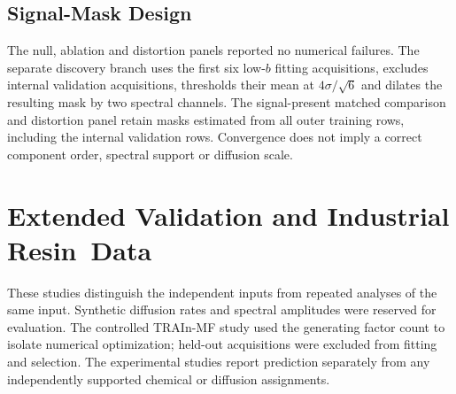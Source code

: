 \documentclass[mathematics,article,accept,moreauthors]{Definitions/mdpi}
\begin{document}
\subsection{Signal-Mask Design}
The null, ablation and distortion panels reported no numerical failures. The separate discovery branch uses the first six low-$b$ fitting acquisitions, excludes internal validation acquisitions, thresholds their mean at $4\sigma/\sqrt{6}$ and dilates the resulting mask by two spectral channels. The signal-present matched comparison and distortion panel retain masks estimated from all outer training rows, including the internal validation rows. Convergence does not imply a correct component order, spectral support or diffusion scale.

%
%


\section{Extended Validation and Industrial Resin~Data}\label{app:completevalidation}
These studies distinguish the independent inputs from repeated analyses of the same input. Synthetic diffusion rates and spectral amplitudes were reserved for evaluation. The controlled TRAIn-MF study used the generating factor count to isolate numerical optimization; held-out acquisitions were excluded from fitting and selection. The experimental studies report prediction separately from any independently supported chemical or diffusion assignments.
\end{document}
